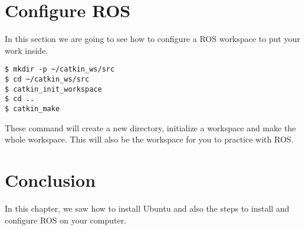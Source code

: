\newpage

\section{Configure ROS}

In this section we are going to see how to configure a ROS workspace to put your work inside.

\begin{lstlisting}[breaklines=True language=bash]
$ mkdir -p ~/catkin_ws/src
$ cd ~/catkin_ws/src
$ catkin_init_workspace
$ cd ..
$ catkin_make
\end{lstlisting}
These command will create a new directory, initialize a workspace and make the whole workspace. This will also be the workspace for you to practice with ROS.
\newpage

\section{Conclusion}
In this chapter, we saw how to install Ubuntu and also the steps to install and configure ROS on your computer.
